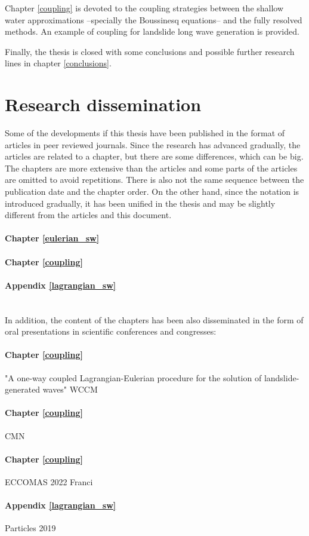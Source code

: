 Chapter \ref{coupling} is devoted to the coupling strategies between the shallow water approximations --specially the Boussinesq equations-- and the fully resolved methods. An example of coupling for landslide long wave generation is provided.

Finally, the thesis is closed with some conclusions and possible further research lines in chapter \ref{conclusions}.







\section{Research dissemination}


Some of the developments if this thesis have been published in the format of articles in peer reviewed journals. Since the research has advanced gradually, the articles are related to a chapter, but there are some differences, which can be big.
The chapters are more extensive than the articles and some parts of the articles are omitted to avoid repetitions.
There is also not the same sequence between the publication date and the chapter order.
On the other hand, since the notation is introduced gradually, it has been unified in the thesis and may be slightly different from the articles and this document.

\paragraph{Chapter \ref{eulerian_sw}} 
\paragraph{Chapter \ref{coupling}} 
\paragraph{Appendix \ref{lagrangian_sw}} 
\\

In addition, the content of the chapters has been also disseminated in the form of oral presentations in scientific conferences and congresses:

\paragraph{Chapter \ref{coupling}} "A one-way coupled Lagrangian-Eulerian procedure for the solution of landslide-generated waves" WCCM
\paragraph{Chapter \ref{coupling}} CMN
\paragraph{Chapter \ref{coupling}} ECCOMAS 2022 Franci
\paragraph{Appendix \ref{lagrangian_sw}} Particles 2019

